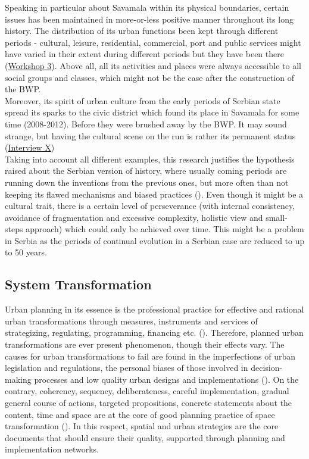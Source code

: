 \documentclass[11pt]{report}
\begin{document}
{Speaking in particular about Savamala within its physical boundaries, certain issues has been maintained in more-or-less positive manner throughout its long history.
The distribution of its urban functions been kept through different periods  - cultural, leisure, residential, commercial, port and public services might have varied in their extent during different periods but they have been there
(\href{Student Workshop}{Workshop 3}).
Above all, all its activities and places were always accessible to all social groups and classes, which might not be the case after the construction of the BWP.
\\

Moreover, its spirit of urban culture from the early periods of Serbian state spread its sparks to the civic district which found its place in Savamala for some time (2008-2012).
Before they were brushed away by the BWP.
It may sound strange, but having the cultural scene on the run is rather its permanent status
(\href{InterviewX}{Interview X})
\\

Taking into account all different examples, this research justifies the hypothesis raised about the Serbian version of history, where usually coming periods are running down the inventions from the previous ones, but more often than not keeping its flawed mechanisms and biased practices (\href{Peric}{\cite{peric_evolution_2016}}).
Even though it might be a cultural trait, there is a certain level of perseverance (with internal consistency, avoidance of fragmentation and excessive complexity, holistic view and small-steps approach) which could only be achieved over time.
This might be a problem in Serbia as the periods of continual evolution in a Serbian case are reduced to up to 50 years.
  
\subsection{System Transformation}

Urban planning in its essence is the professional practice for effective and rational urban transformations through measures, instruments and services of strategizing, regulating, programming, financing etc.
(\href{Stojkov}{\cite{stojkov_teorijska_2012}}).
Therefore, planned urban transformations are ever present phenomenon, though their effects vary.
The causes for urban transformations to fail are found in the imperfections  of  urban  legislation  and regulations, the personal biases of those involved in decision-making processes and low quality urban designs and implementations (\href{Grozdanic}{\cite{grozdanic_belgrade_2008}}).
On the contrary, coherency, sequency,  deliberateness, careful implementation, gradual  general course of actions, targeted propositions, concrete statements about the content, time and space are at the core of good planning practice of space transformation (\cite{Boisiere, 1981 ????}).
In this respect, spatial and urban strategies are the core documents that should ensure their quality, supported through planning and implementation networks.
\\

}
\end{document}
